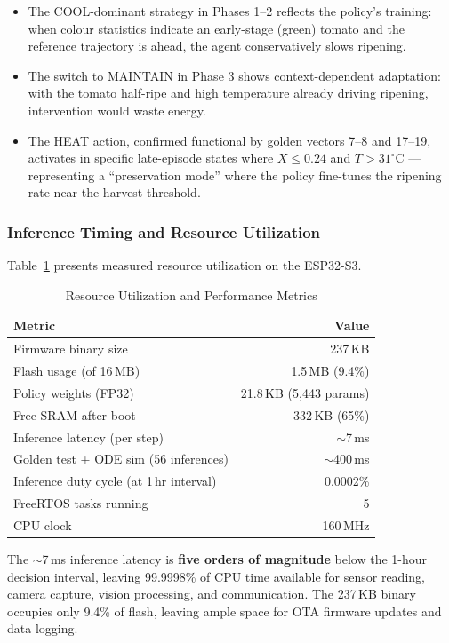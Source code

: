 \begin{itemize}
    \item The COOL-dominant strategy in Phases 1--2 reflects the policy's training: when colour statistics indicate an early-stage (green) tomato and the reference trajectory is ahead, the agent conservatively slows ripening.
    \item The switch to MAINTAIN in Phase 3 shows context-dependent adaptation: with the tomato half-ripe and high temperature already driving ripening, intervention would waste energy.
    \item The HEAT action, confirmed functional by golden vectors 7--8 and 17--19, activates in specific late-episode states where $X \leq 0.24$ and $T > 31^\circ$C --- representing a ``preservation mode'' where the policy fine-tunes the ripening rate near the harvest threshold.
\end{itemize}

\subsubsection{Inference Timing and Resource Utilization}

Table~\ref{tab:resource_util} presents measured resource utilization on the ESP32-S3.

\begin{table}[htbp]
\caption{Resource Utilization and Performance Metrics}
\label{tab:resource_util}
\centering
\begin{tabular}{@{}lr@{}}
\toprule
\textbf{Metric} & \textbf{Value} \\
\midrule
Firmware binary size & 237\,KB \\
Flash usage (of 16\,MB) & 1.5\,MB (9.4\%) \\
Policy weights (FP32) & 21.8\,KB (5{,}443 params) \\
Free SRAM after boot & 332\,KB (65\%) \\
Inference latency (per step) & $\sim$7\,ms \\
Golden test + ODE sim (56 inferences) & $\sim$400\,ms \\
Inference duty cycle (at 1\,hr interval) & 0.0002\% \\
FreeRTOS tasks running & 5 \\
CPU clock & 160\,MHz \\
\bottomrule
\end{tabular}
\end{table}

The $\sim$7\,ms inference latency is \textbf{five orders of magnitude} below the 1-hour decision interval, leaving 99.9998\% of CPU time available for sensor reading, camera capture, vision processing, and communication. The 237\,KB binary occupies only 9.4\% of flash, leaving ample space for OTA firmware updates and data logging.

